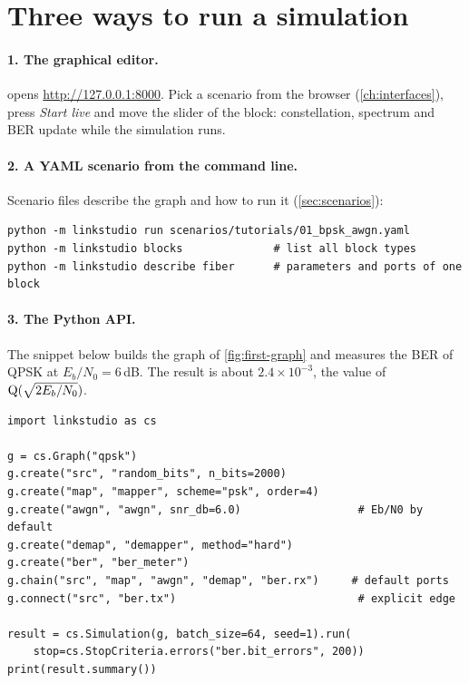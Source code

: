 \section{Three ways to run a simulation}\label{sec:three-ways}

\paragraph{1. The graphical editor.}
 opens \url{http://127.0.0.1:8000}. Pick a scenario from the
browser (\cref{ch:interfaces}), press \emph{Start live} and move the
 slider of the  block: constellation, spectrum and BER update while
the simulation runs.

\paragraph{2. A YAML scenario from the command line.}
Scenario files describe the graph and how to run it (\cref{sec:scenarios}):
\begin{lstlisting}[style=shell]
python -m linkstudio run scenarios/tutorials/01_bpsk_awgn.yaml
python -m linkstudio blocks              # list all block types
python -m linkstudio describe fiber      # parameters and ports of one block
\end{lstlisting}

\paragraph{3. The Python API.}
The snippet below builds the graph of \cref{fig:first-graph} and measures the BER of QPSK at
$E_b/N_0=6$\,dB. The result is about $2.4\times10^{-3}$, the value of
$\operatorname{Q}(\sqrt{2E_b/N_0})$.
\begin{lstlisting}[style=py,numbers=none]
import linkstudio as cs

g = cs.Graph("qpsk")
g.create("src", "random_bits", n_bits=2000)
g.create("map", "mapper", scheme="psk", order=4)
g.create("awgn", "awgn", snr_db=6.0)                  # Eb/N0 by default
g.create("demap", "demapper", method="hard")
g.create("ber", "ber_meter")
g.chain("src", "map", "awgn", "demap", "ber.rx")     # default ports
g.connect("src", "ber.tx")                            # explicit edge

result = cs.Simulation(g, batch_size=64, seed=1).run(
    stop=cs.StopCriteria.errors("ber.bit_errors", 200))
print(result.summary())
\end{lstlisting}

